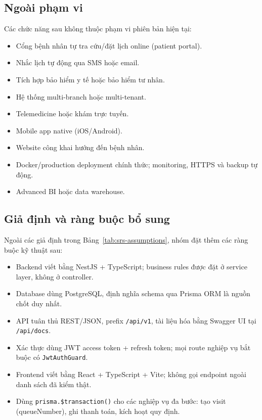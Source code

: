 \subsection{Ngoài phạm vi}
\label{subsec:srs-out-of-scope}

Các chức năng sau không thuộc phạm vi phiên bản hiện tại:

\begin{itemize}
    \item Cổng bệnh nhân tự tra cứu/đặt lịch online (patient portal).
    \item Nhắc lịch tự động qua SMS hoặc email.
    \item Tích hợp bảo hiểm y tế hoặc bảo hiểm tư nhân.
    \item Hệ thống multi-branch hoặc multi-tenant.
    \item Telemedicine hoặc khám trực tuyến.
    \item Mobile app native (iOS/Android).
    \item Website công khai hướng đến bệnh nhân.
    \item Docker/production deployment chính thức; monitoring, HTTPS và backup tự động.
    \item Advanced BI hoặc data warehouse.
\end{itemize}

\subsection{Giả định và ràng buộc bổ sung}
\label{subsec:srs-constraints}

Ngoài các giả định trong Bảng~\ref{tab:srs-assumptions}, nhóm đặt thêm các ràng buộc kỹ thuật sau:

\begin{itemize}
    \item Backend viết bằng NestJS + TypeScript; business rules được đặt ở service layer, không ở controller.
    \item Database dùng PostgreSQL, định nghĩa schema qua Prisma ORM là nguồn chốt duy nhất.
    \item API tuân thủ REST/JSON, prefix \texttt{/api/v1}, tài liệu hóa bằng Swagger UI tại \texttt{/api/docs}.
    \item Xác thực dùng JWT access token + refresh token; mọi route nghiệp vụ bắt buộc có \texttt{JwtAuthGuard}.
    \item Frontend viết bằng React + TypeScript + Vite; không gọi endpoint ngoài danh sách đã kiểm thật.
    \item Dùng \verb|prisma.$transaction()| cho các nghiệp vụ đa bước: tạo visit (queueNumber), ghi thanh toán, kích hoạt quy định.
\end{itemize}

